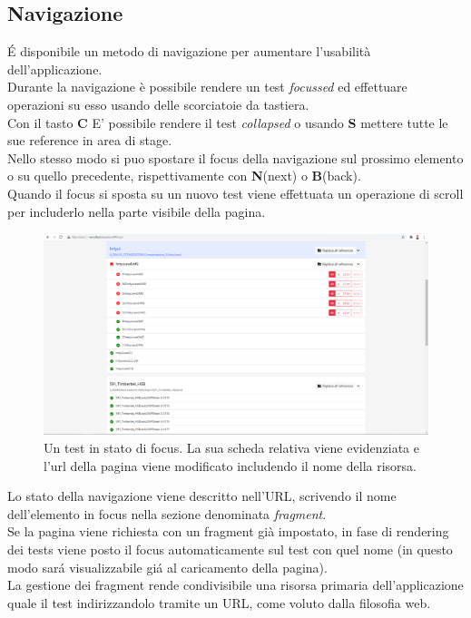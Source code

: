         \subsection{Navigazione}
            \'E disponibile un metodo di navigazione per aumentare l'usabilità dell'applicazione.\\
            Durante la navigazione è possibile rendere un test \textit{focussed} ed effettuare operazioni su esso usando delle scorciatoie da tastiera.\\
            Con il tasto \textbf{C} E' possibile rendere il test \textit{collapsed} o usando \textbf{S} mettere tutte le sue reference in area di stage.\\ 
            Nello stesso modo si puo spostare il focus della navigazione sul prossimo elemento o su quello precedente, rispettivamente con \textbf{N}(next) o \textbf{B}(back).\\
            Quando il focus si sposta su un nuovo test viene effettuata un operazione di scroll per includerlo nella parte visibile della pagina.\\
            
            \begin{figure}[h!]
                \includegraphics[width=\textwidth]{images/active.png}
                \caption{Un test in stato di focus. La sua scheda relativa viene evidenziata e l'url della pagina viene modificato includendo il nome della risorsa.}
            \end{figure}

            Lo stato della navigazione viene descritto nell'URL, scrivendo il nome dell'elemento in focus nella sezione denominata \textit{fragment}.\\
            Se la pagina viene richiesta con un fragment già impostato, in fase di rendering dei tests viene posto il focus automaticamente sul test con quel nome (in questo modo sar\'a visualizzabile gi\'a al caricamento della pagina).\\
            La gestione dei fragment rende condivisibile una risorsa primaria dell'applicazione quale il test indirizzandolo tramite un URL, come voluto dalla filosofia web. 
            
